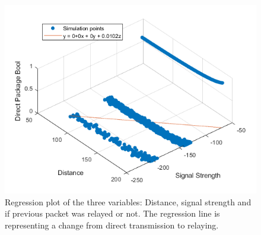 \begin{figure}[h]
	\centering
	\includegraphics[width=\linewidth]{theory/protocolDecisionExample/fig/regressionPlot.png}
	\caption{Regression plot of the three variables: Distance, signal strength and if previous packet was relayed or not. The regression line is representing a change from direct transmission to relaying.}
	\label{fig:regressionPlot}
\end{figure}